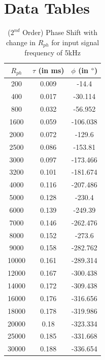 \documentclass[]{risa}
\begin{document}
	\begin{minipage}{\columnwidth}
		
		\label{mult_code}
	\end{minipage}
	
	\begin{minipage}{\columnwidth}
		
		\label{delayblock_code}
	\end{minipage}
	
	\begin{minipage}{\columnwidth}
		
		\label{integrator_code}
	\end{minipage}
	
		
\section{Data Tables}

\begin{table}[H]
    \centering
    \caption{($2^{nd}$ Order) Phase Shift with change in $R_{ph}$ for input signal frequency of 5kHz}
\begin{tabular}{|c|c|c|}
\hline
$R_{ph}$ & $\tau$ (in ms) & $\phi$ (in $\degree$) \\ 
\hline
200 & 0.009 & -14.4 \\ 
400 & 0.017 & -30.114 \\ 
800 & 0.032 & -56.952 \\ 
1600 & 0.059 & -106.038 \\ 
2000 & 0.072 & -129.6 \\ 
2500 & 0.086 & -153.81 \\ 
3000 & 0.097 & -173.466 \\ 
3200 & 0.101 & -181.674 \\ 
4000 & 0.116 & -207.486 \\ 
5000 & 0.128 & -230.4 \\ 
6000 & 0.139 & -249.39 \\ 
7000 & 0.146 & -262.476 \\ 
8000 & 0.152 & -273.6 \\ 
9000 & 0.158 & -282.762 \\ 
10000 & 0.161 & -289.314 \\ 
12000 & 0.167 & -300.438 \\ 
14000 & 0.172 & -309.438 \\ 
16000 & 0.176 & -316.656 \\ 
18000 & 0.178 & -319.986 \\ 
20000 & 0.18 & -323.334 \\ 
25000 & 0.185 & -331.668 \\ 
30000 & 0.188 & -336.654 \\ 

\hline
\end{tabular}
    \label{tab:delay_vs_rph}
\end{table}
\end{document}
